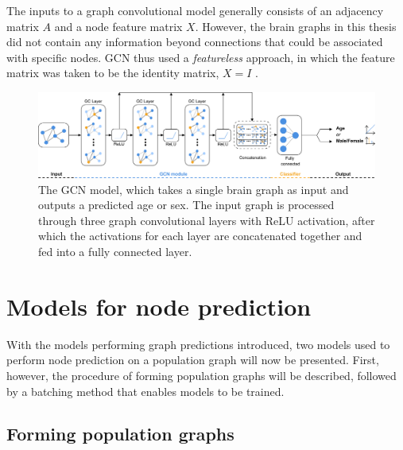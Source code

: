 The inputs to a graph convolutional model generally consists of an adjacency matrix $A$ and a node feature matrix $X$. However, the brain graphs in this thesis did not contain any information beyond connections that could be associated with specific nodes. GCN thus used a \textit{featureless} approach, in which the feature matrix was taken to be the identity matrix, $X=I$ \cite{kipf_vae}.

\begin{figure}[!htbp]
    \centering
    \includegraphics[width=\textwidth]{chapters/images_methods/base_v2.png}
    \caption{The GCN model, which takes a single brain graph as input and outputs a predicted age or sex. The input graph is processed through three graph convolutional layers with ReLU activation, after which the activations for each layer are concatenated together and fed into a fully connected layer.}
    \label{fig:gcn_base}
\end{figure}


%         



\section{Models for node prediction}

With the models performing graph predictions introduced, two models used to perform node prediction on a population graph will now be presented. First, however, the procedure of forming population graphs will be described, followed by a batching method that enables models to be trained.

\subsection{Forming population graphs}

